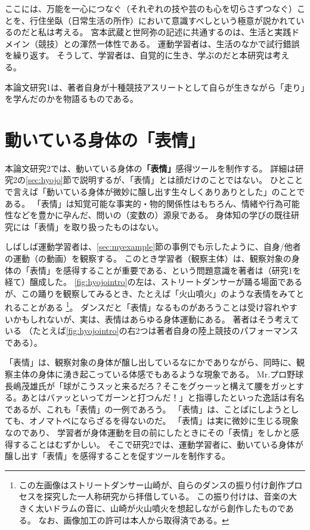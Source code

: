 ここには、万能を一心につなぐ（それぞれの技や芸のも心を切らさずつなぐ）ことを、行住坐臥（日常生活の所作）において意識すべしという極意が説かれているのだと私は考える。
宮本武蔵と世阿弥の記述に共通するのは、生活と実践ドメイン（競技）との渾然一体性である。
運動学習者は、生活のなかで試行錯誤を繰り返す。
そうして、学習者は、自覚的に生き、学ぶのだと本研究は考える。

本論文研究1は、著者自身が十種競技アスリートとして自らが生きながら「走り」を学んだのかを物語るものである。

\section{動いている身体の「表情」}
\label{sec:ugoiteirushintainohyojo_intro}
本論文研究2では、動いている身体の\textbf{「表情」}\cite{hiromatsu:1989}感得ツールを制作する。
詳細は研究2の\ref{sec:hyojo}節で説明するが、「表情」とは顔だけのことではない。
ひとことで言えば「動いている身体が微妙に醸し出す生々しくありありとした」のことである。
「表情」は知覚可能な事実的・物的関係性はもちろん、情緒や行為可能性などを豊かに孕んだ、問いの（変数の）源泉である。
身体知の学びの既往研究には「表情」を取り扱ったものはない。

しばしば運動学習者は、\ref{sec:myexample}節の事例でも示したように、自身/他者の運動（の動画）を観察する。
このとき学習者（観察主体）は、観察対象の身体の「表情」を感得することが重要である、という問題意識を著者は（研究1を経て）醸成した。
\autoref{fig:hyojointro}の左は、ストリートダンサーが踊る場面であるが、この踊りを観察してみるとき、たとえば「火山噴火」のような表情をみてとれることがある
\footnote{
  この左画像はストリートダンサー山崎が、自らのダンスの振り付け創作プロセスを探究した一人称研究\cite{yamazaki:2017}から拝借している。
  この振り付けは、音楽の大きく太いドラムの音に、山崎が火山噴火を想起しながら創作したものである。
  なお、画像加工の許可は本人から取得済である。  
}。
ダンスだと「表情」なるものがあろうことは受け容れやすいかもしれないが、実は、表情はあらゆる身体運動にある。
著者はそう考えている
（たとえば\autoref{fig:hyojointro}の右2つは著者自身の陸上競技のパフォーマンスである）。

「表情」は、観察対象の身体が醸し出しているなにかでありながら、同時に、観察主体の身体に湧き起こっている体感でもあるような現象である。
Mr.プロ野球長嶋茂雄氏が「球がこうスッと来るだろ？そこをグゥーッと構えて腰をガッとする。あとはバァッといってガーンと打つんだ！」と指導したといった逸話は有名であるが、これも「表情」の一例であろう。
「表情」は、ことばにしようとしても、オノマトペにならざるを得ないのだ。
「表情」は実に微妙に生じる現象なのであり、
学習者が身体運動を目の前にしたときにその「表情」をしかと感得することはむずかしい。
そこで研究2では、運動学習者に、動いている身体が醸し出す「表情」を感得することを促すツールを制作する。

